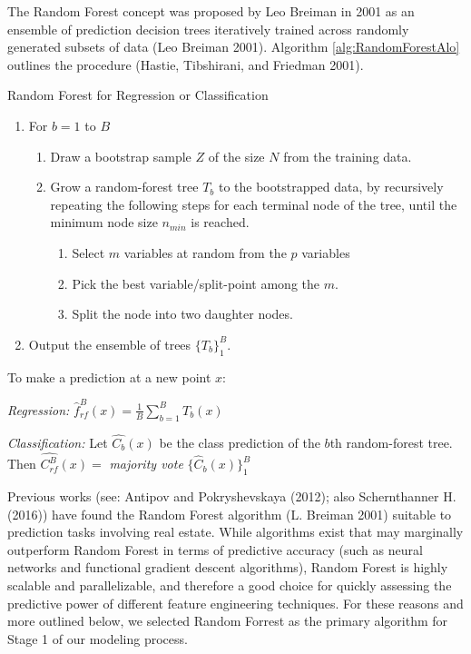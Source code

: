 \documentclass[12pt,]{article}
\begin{document}
The Random Forest concept was proposed by Leo Breiman in 2001 as an
ensemble of prediction decision trees iteratively trained across
randomly generated subsets of data (Leo Breiman 2001). Algorithm
\ref{alg:RandomForestAlo} outlines the procedure (Hastie, Tibshirani,
and Friedman 2001).

\begin{algorithm}
  \caption{Random Forest for Regression or Classification}\label{alg:RandomForestAlo}

\begin{enumerate}
  \item For $b = 1$ to $B$
  \begin{enumerate}
    \item Draw a bootstrap sample $Z$ of the size $N$ from the training data.
    \item Grow a random-forest tree $T_b$ to the bootstrapped data, by recursively repeating the following steps for each terminal node of the tree, until the minimum node size $n_{min}$ is reached.
  \begin{enumerate}
    \item Select $m$ variables at random from the $p$ variables
    \item Pick the best variable/split-point among the $m$.
    \item Split the node into two daughter nodes.
  \end{enumerate}
  \end{enumerate}
  \item Output the ensemble of trees $\{T_b\}_1^B$.
\end{enumerate}

To make a prediction at a new point $x$:

\textit{Regression:} $\hat{f}_{rf}^B(x) = \frac{1}{B}\sum_{b=1}^{B}T_b(x)$

\textit{Classification:} Let $\hat{C_b}(x)$ be the class prediction of the $b$th random-forest tree. Then $\hat{C_{rf}^B}(x)=$ \textit{majority vote} $\{\hat{C}_{b}(x)\}_1^B $

\end{algorithm}

Previous works (see: Antipov and Pokryshevskaya (2012); also
Schernthanner H. (2016)) have found the Random Forest algorithm (L.
Breiman 2001) suitable to prediction tasks involving real estate. While
algorithms exist that may marginally outperform Random Forest in terms
of predictive accuracy (such as neural networks and functional gradient
descent algorithms), Random Forest is highly scalable and
parallelizable, and therefore a good choice for quickly assessing the
predictive power of different feature engineering techniques. For these
reasons and more outlined below, we selected Random Forrest as the
primary algorithm for Stage 1 of our modeling process.
\end{document}
